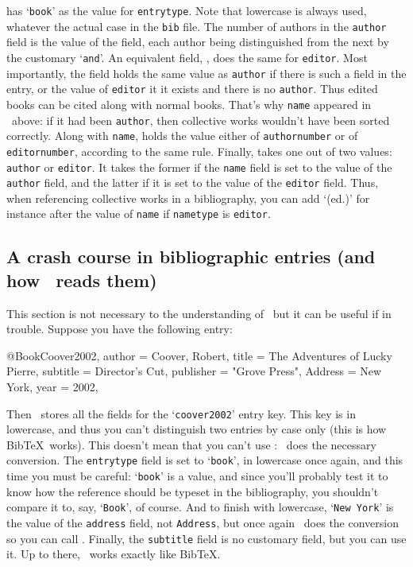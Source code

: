 \noindent has `\texttt{book}' as the value for \texttt{entrytype}. Note
that lowercase is always used, whatever the actual case in the \texttt{bib} file.
The number of authors in the \texttt{author} field is the value of the 
field, each author being distinguished from the next by the customary `\texttt{and}'.
An equivalent field, , does the same for \texttt{editor}.
Most importantly, the  field holds the same value as \texttt{author}
if there is such a field in the entry, or the value of \texttt{editor}
it it exists and there is no \texttt{author}. Thus edited books can be
cited along with normal books. That's why \texttt{name} appeared in
\tcmd\SortingOrder\ above: if it had been \texttt{author}, then collective
works wouldn't have been sorted correctly. Along with \texttt{name},
 holds the value either of \texttt{authornumber} or
of \texttt{editornumber}, according to the same rule. Finally, 
takes one out of two values: \texttt{author} or \texttt{editor}. It
takes the former if the \texttt{name} field is set to the value of the \texttt{author}
field, and the latter if it is set to the value of the \texttt{editor} field.
Thus, when referencing collective works in a bibliography, you can add
`(ed.)' for instance after the value of \texttt{name} if \texttt{nametype}
is \texttt{editor}.




\subsection{A crash course in bibliographic entries (and how \lib\ reads them)}
This section is not necessary to the understanding of \lib\ but it can be
useful if in trouble. Suppose you have the following entry:

\verbatim
@Book{Coover2002,
  author = {Coover, Robert},
  title = {The Adventures of Lucky Pierre},
  subtitle = {Director's Cut},
  publisher = "Grove Press",
  Address = {New York},
  year = 2002,
}
\endverbatim

\noindent Then \lib\ stores all the fields for the `\texttt{coover2002}' entry key.
This key is in lowercase, and thus you can't distinguish two entries by case only
(this is how Bib\TeX\ works). This doesn't mean that you can't use
: \lib\ does the necessary conversion.
The \texttt{entrytype} field is set to `\texttt{book}', in lowercase once again, and
this time you must be careful: `\texttt{book}' is a value, and since you'll probably
test it to know how the reference should be typeset in the bibliography, you
shouldn't compare it to, say, `\texttt{Book}', of course. And to finish with
lowercase, `\texttt{New York}' is the value of the \texttt{address} field,
not \texttt{Address}, but once again \lib\ does the conversion so you can call
. Finally, the \texttt{subtitle}
field is no customary field, but you can use it. Up to there, \lib\ works
exactly like Bib\TeX.

